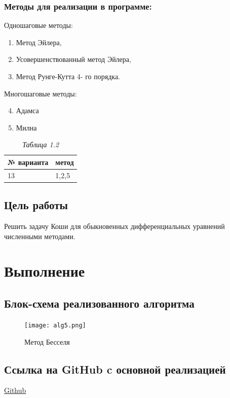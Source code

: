 \documentclass{article}
\begin{document}
      \subsubsection{Методы для реализации в программе:}
            Одношаговые методы:
            \begin{enumerate}
                  \item Метод Эйлера,
                  \item Усовершенствованный метод Эйлера,
                  \item Метод Рунге-Кутта 4- го порядка.
            \end{enumerate}
            Многошаговые методы:         
            \begin{enumerate}
            	\setcounter{enumi}{3}
            	\item Адамса
            	\item Милна
            \end{enumerate}
            \begin{table}[H]
                  \begin{tabular}{|l|l|}
                        \hline
                        № варианта & метод \\ \hline
                        13 & 1,2,5 \\ \hline
                  \end{tabular}
                  \caption{\small \sl {Таблица 1.2}} 
            \end{table}
\subsection{Цель работы}
      Решить задачу Коши для обыкновенных дифференциальных уравнений численными методами.



\section{Выполнение}            
      \subsection{Блок-схема реализованного алгоритма}
		\begin{figure}[H]
    		\centering
    		\texttt{[image: alg5.png]}
    		\caption[Схема-1]{Метод Бесселя}
    		\label{fig:screenshot003}
    	\end{figure}             
      \subsection{Ссылка на GitHub c основной реализацией}
            \href{https://github.com/isofinly/compmath}{Github}
\end{document}
